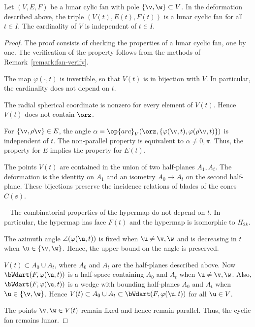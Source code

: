 \begin{lemma}\label{lemma:lunar-deform} 
Let $(V,E,F)$ be a lunar cylic fan with pole $\{\v,\w\}\subset V$.  In
the deformation described above, the triple $(V(t),E(t),F(t))$ is a
lunar cyclic fan for all $t\in I$.  The cardinality of $V$ is
independent of $t\in I$.
\end{lemma}

\begin{proof} The proof consists of checking the properties of a lunar
cyclic fan, one by one.  The verification of the property 
follows from the methods of Remark~\ref{remark:fan-verify}.

The map $\varphi(\cdot,t)$ is invertible, so that $V(t)$ is in
bijection with $V$.  In particular, the cardinality does not depend
on $t$.

 The radial spherical coordinate is nonzero for every
element of $V(t)$.  Hence $V(t)$ does not contain $\orz$.

 For $\{\v,\rho \v\}\in E$, the angle
$\alpha=\op{arc}_V(\orz,\{\varphi(\v,t),\varphi(\rho \v,t)\})$ is
independent of $t$.  The non-parallel property is equivalent to
$\alpha\ne0,\pi$.  Thus, the  property for $E$ implies
the property for $E(t)$.

 The points $V(t)$ are contained in the union of
two half-planes $A_1,A_t$.  The deformation is the identity on $A_1$
and an isometry $A_0\to A_t$ on the second half-plane.  These
bijections preserve the incidence relations of blades of the cones
$C(\ee)$.

~ The combinatorial properties of
the hypermap do not depend on $t$.  In particular, the hypermap has
face $F(t)$ and the hypermap is isomorphic to $H_{2k}$.

 The azimuth angle $\angle(\varphi(\u,t))$ is fixed when
$\u\ne \v,\w$ and is decreasing in $t$ when $\u\in \{\v,\w\}$.
Hence, the upper bound on the angle is preserved.

 $V(t)\subset A_0\cup A_t$, where $A_0$ and $A_t$ are
the half-planes described above.  Now $\bWdart(F,\varphi(\u,t))$ is
a half-space containing $A_0$ and $A_t$ when $\u\ne \v,\w$.  Also,
$\bWdart(F,\varphi(\u,t))$ is a wedge with bounding half-planes
$A_0$ and $A_t$ when $\u\in \{\v,\w\}$.  Hence $V(t)\subset A_0\cup
A_t\subset \bWdart(F,\varphi(\u,t))$ for all $\u\in V$.

 The points $\v,\w\in V(t)$ remain fixed and hence
remain parallel.  Thus, the cyclic fan remains lunar.
\end{proof}
%

